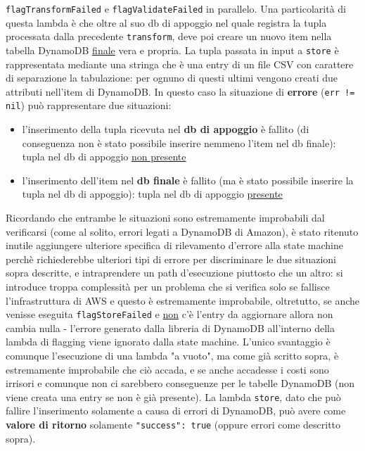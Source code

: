 \documentclass[
    sigconf, 
    screen=false, 
    acmthm=false, 
    nonacm
]{acmart}
\begin{document}
\begin{itemize}
    \texttt{flagTransformFailed} e \texttt{flagValidateFailed} in parallelo. Una particolarità di questa lambda è 
    che oltre al suo db di
    appoggio nel quale registra la tupla processata dalla precedente \texttt{transform}, deve poi creare un nuovo item nella
    tabella DynamoDB \underline{finale} vera e propria. La tupla passata in input a \texttt{store} è rappresentata mediante una stringa
    che è una entry di un file CSV con carattere di separazione la tabulazione: per ognuno di questi ultimi vengono 
    creati due attributi nell'item di DynamoDB. In questo caso la situazione di \textbf{errore} (\texttt{err != nil}) può
    rappresentare due situazioni:
    \begin{itemize}
        \item l'inserimento della tupla ricevuta nel \textbf{db di appoggio} è fallito (di conseguenza non è stato possibile 
        inserire nemmeno l'item nel db finale): tupla nel db di appoggio \underline{non presente}
        \item l'inserimento dell'item nel \textbf{db finale} è fallito (ma è stato possibile inserire la tupla nel db di 
        appoggio): tupla nel db di appoggio \underline{presente}
    \end{itemize}
    Ricordando che entrambe le situazioni sono estremamente improbabili dal verificarsi (come al solito, errori legati
    a DynamoDB di Amazon), è stato ritenuto inutile aggiungere ulteriore specifica di rilevamento d'errore alla state machine 
    perchè richiederebbe ulteriori tipi di errore \cite{goerrors} per discriminare le due situazioni 
    sopra descritte, e intraprendere un path d'esecuzione piuttosto che un altro: si introduce troppa complessità per un 
    problema che si verifica solo se fallisce l'infrastruttura di AWS e questo è estremamente improbabile, 
    oltretutto, se anche venisse eseguita \texttt{flagStoreFailed} e \underline{non} c'è l'entry da aggiornare allora non cambia nulla - 
    l'errore generato dalla libreria di DynamoDB all'interno della lambda di flagging viene ignorato dalla state machine. L'unico svantaggio è 
    comunque l'esecuzione di una lambda "a vuoto", ma come già scritto 
    sopra, è estremamente improbabile che ciò accada, e se anche accadesse i costi sono irrisori e comunque non 
    ci sarebbero conseguenze per le tabelle DynamoDB (non viene creata una entry se non è già presente).
    La lambda \texttt{store}, dato che può fallire l'inserimento solamente a causa di errori di DynamoDB, può avere come
    \textbf{valore di ritorno} solamente \texttt{"success": true} (oppure errori come descritto sopra).
\end{itemize}
\end{document}
